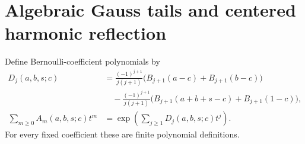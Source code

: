 \providecommand{\agrcAddStirling}[2]{\left\{\begin{matrix}#1\\#2\end{matrix}\right\}}
\section{Algebraic Gauss tails and centered harmonic reflection}
\label{agrc-add:section}

Define Bernoulli-coefficient polynomials by
\begin{align*}
 D_j(a,b,s;c)&=\frac{(-1)^{j+1}}{j(j+1)}
 \bigl(B_{j+1}(a-c)+B_{j+1}(b-c)\bigr)\\
 &\quad-\frac{(-1)^{j+1}}{j(j+1)}\bigl(B_{j+1}(a+b+s-c)+B_{j+1}(1-c)\bigr),\\
 \sum_{m\geq0}A_m(a,b,s;c)t^m
   &=\exp\left(\sum_{j\geq1}D_j(a,b,s;c)t^j\right).
\end{align*}
For every fixed coefficient these are finite polynomial definitions.

